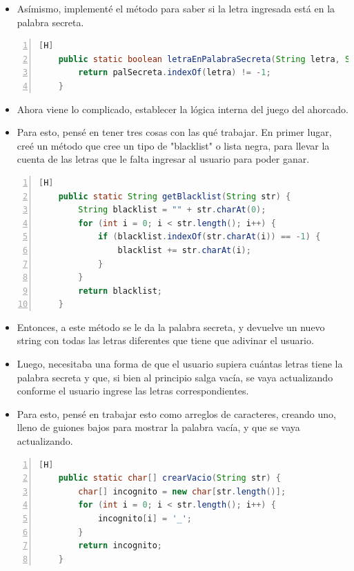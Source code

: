 \documentclass{article}
\begin{document}
	\begin{itemize}	
		\item Asímismo, implementé el método para saber si la letra ingresada está en la palabra secreta. 
	\end{itemize}
	\begin{lstlisting}[language=java,caption={Letra en palabra secreta}, numbers=left][H]
	public static boolean letraEnPalabraSecreta(String letra, String palSecreta) {
        return palSecreta.indexOf(letra) != -1;
    }
	\end{lstlisting}
	\begin{itemize}	
		\item Ahora viene lo complicado, establecer la lógica interna del juego del ahorcado.
		\item Para esto, pensé en tener tres cosas con las qué trabajar. En primer lugar, creé un método que cree un tipo de "blacklist" o lista negra, para llevar la cuenta de las letras que le falta ingresar al usuario para poder ganar.
	\end{itemize}
	\begin{lstlisting}[language=java,caption={Creando una blacklist}, numbers=left][H]
	public static String getBlacklist(String str) {
        String blacklist = "" + str.charAt(0);
        for (int i = 0; i < str.length(); i++) {
            if (blacklist.indexOf(str.charAt(i)) == -1) {
                blacklist += str.charAt(i);
            }
        }
        return blacklist;
    }
	\end{lstlisting}
	\begin{itemize}	
		\item Entonces, a este método se le da la palabra secreta, y devuelve un nuevo string con todas las letras diferentes que tiene que adivinar el usuario.
		\item Luego, necesitaba una forma de que el usuario supiera cuántas letras tiene la palabra secreta y que, si bien al principio salga vacía, se vaya actualizando conforme el usuario ingrese las letras correspondientes.
		\item Para esto, pensé en trabajar esto como arreglos de caracteres, creando uno, lleno de guiones bajos para mostrar la palabra vacía, y que se vaya actualizando.
	\end{itemize}
	\begin{lstlisting}[language=java,caption={Creando la plantilla de la palabra secreta}, numbers=left][H]
	public static char[] crearVacio(String str) {
        char[] incognito = new char[str.length()];
        for (int i = 0; i < str.length(); i++) {
            incognito[i] = '_';
        }
        return incognito;
    }
	\end{lstlisting}
\end{document}

